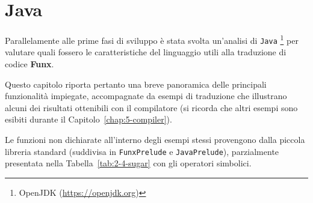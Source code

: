 \chapter{Java}
\label{chap:4-java}

Parallelamente alle prime fasi di sviluppo è stata svolta un'analisi di \texttt{Java}%
\footnote{OpenJDK (\url{https://openjdk.org})}
per valutare quali fossero le caratteristiche del linguaggio utili alla traduzione di codice \textbf{Funx}.

\noindent Questo capitolo riporta pertanto una breve panoramica delle principali funzionalità impiegate,
accompagnate da esempi di traduzione che illustrano alcuni dei risultati ottenibili con il compilatore
(si ricorda che altri esempi sono esibiti durante il Capitolo~\ref{chap:5-compiler}).

Le funzioni non dichiarate all'interno degli esempi stessi provengono dalla piccola libreria standard
(suddivisa in \texttt{FunxPrelude} e \texttt{JavaPrelude}),
parzialmente presentata nella Tabella~\ref{tab:2-4-sugar} con gli operatori simbolici.



\newpage



\newpage


